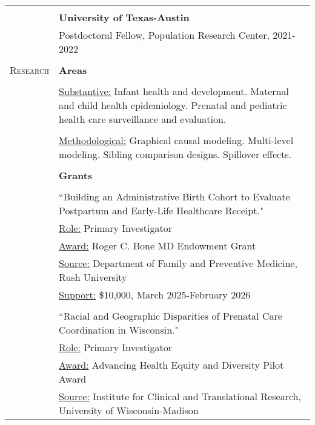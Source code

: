 \documentclass[letterpaper,10pt,oneside]{article}
\begin{document}
\begin{longtable}{@{} p{} p{}}
     & \\
     & \textbf{University of Texas-Austin} \\
     & Postdoctoral Fellow, Population Research Center, 2021-2022 \\
     & \\
\textsc{Research}   &\textbf{Areas} \\
    & \\
    & \parbox{6.15in}{\underline{Substantive:} Infant health and development. Maternal and child health epidemiology. Prenatal and pediatric health care surveillance and evaluation.} \\
    & \\
    & \parbox{6.15in}{\underline{Methodological:} Graphical causal modeling. Multi-level modeling. Sibling comparison designs. Spillover effects.} \\
    & \\
    &\textbf{Grants} \\
    & \\
    & \parbox{6.15in}{``Building an Administrative Birth Cohort to Evaluate Postpartum and Early-Life Healthcare Receipt."} \\
    & \parbox{6.15in}{\hspace*{1.5em}\underline{Role:} Primary Investigator} \\
    & \parbox{6.15in}{\hspace*{1.5em}\underline{Award:} Roger C. Bone MD Endowment Grant} \\
    & \parbox{6.15in}{\hspace*{1.5em}\underline{Source:} Department of Family and Preventive Medicine, Rush University} \\
    & \parbox{6.15in}{\hspace*{1.5em}\underline{Support:} \$10,000, March 2025-February 2026} \\
    & \\
    & \parbox{6.15in}{``Racial and Geographic Disparities of Prenatal Care Coordination in Wisconsin."} \\
    & \parbox{6.15in}{\hspace*{1.5em}\underline{Role:} Primary Investigator} \\
    & \parbox{6.15in}{\hspace*{1.5em}\underline{Award:} Advancing Health Equity and Diversity Pilot Award} \\
    & \parbox{6.15in}{\hspace*{1.5em}\underline{Source:} Institute for Clinical and Translational Research, University of Wisconsin-Madison} \\

\end{longtable}
\end{document}
